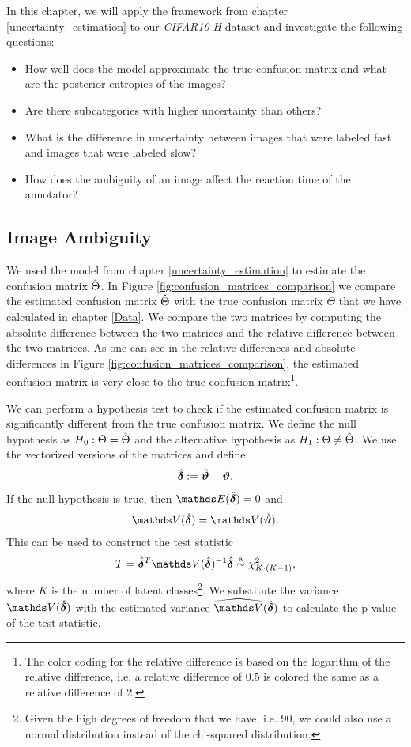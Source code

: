In this chapter, we will apply the framework from chapter \ref{uncertainty_estimation}
to our \textit{CIFAR10-H} dataset and investigate the following questions:
\begin{itemize}
    \item How well does the model approximate the true confusion matrix and what are
    the posterior entropies of the images?
    \item Are there subcategories with higher uncertainty than others?
    \item What is the difference in uncertainty between images that were labeled fast
    and images that were labeled slow?
    \item How does the ambiguity of an image affect the reaction time of the annotator?
\end{itemize}

\subsection{Image Ambiguity}

We used the model from chapter \ref{uncertainty_estimation} to estimate the
confusion matrix $\hat{\Theta}$. In Figure \ref{fig:confusion_matrices_comparison} we
compare the estimated confusion matrix $\hat{\Theta}$ with the true confusion matrix
$\Theta$ that we have calculated in chapter \ref{Data}. We compare the two
matrices by computing the absolute difference between the two matrices and the
relative difference between the two matrices. As one can see in the relative
differences and absolute differences in Figure
\ref{fig:confusion_matrices_comparison}, the estimated confusion matrix is very
close to the true confusion matrix\footnote{The color coding for the
relative difference is based on the logarithm of the relative difference, i.e. a
relative difference of 0.5 is colored the same as a relative difference of 2.}.\bigskip

We can perform a hypothesis test to check if the estimated confusion matrix is
significantly different from the true confusion matrix. We define the null
hypothesis as $H_0: \Theta = \hat{\Theta}$ and the alternative hypothesis as $H_1:
\Theta \neq \hat{\Theta}$. We use the vectorized versions of the matrices and define
\begin{align}
  \hat{\bm{\delta}} := \hat{\bm{\vartheta}} - \bm{\vartheta}.
  \label{eq:delta}
\end{align}
If the null hypothesis is true, then $\E(\hat{\bdelta}) = 0$ and 
\begin{align}
  \V(\hat{\bdelta}) = \V(\hbvtheta).
  \label{eq:variance}
\end{align}
This can be used to construct the test statistic 
\begin{align}
  T = \hat{\bdelta}^T \V(\hat{\bdelta})^{-1} \hat{\bdelta} \overset{\text{a}}{\sim} \chi^2_{K\cdot(K-1)},
  \label{eq:test_statistic}
\end{align}
where $K$ is the number of latent classes\footnote{Given the high degrees of
freedom that we have, i.e. 90, we could also use a normal distribution instead
of the chi-squared distribution.}. We substitute the variance
$\V(\hat{\bdelta})$ with the estimated variance $\widehat{\V}(\hat{\bdelta})$
to calculate the p-value of the test statistic.\bigskip

